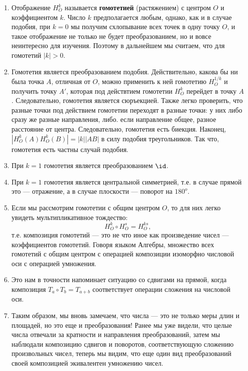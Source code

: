 \begin{enumerate}
\item Отображение $H_O^k$ называется \textbf{гомотетией} (растяжением) с центром $O$ и коэффициентом $k$. Число $k$ предполагается любым, однако, как и в случае подобия, при $k=0$ мы получим схлопывание всех точек в одну точку $O$, и такое отображение не только не будет преобразованием, но и вовсе неинтересно для изучения. Поэтому в дальнейшем мы считаем, что для гомотетий $|k|>0$.
\item Гомотетия является преобразованием подобия. Действительно, какова бы ни была точка $A$, отличная от $O$, можно применить к ней гомотетию $H_O^{1/k}$ и получить точку $A'$, которая под действтием гомотетии $H_O^k$ перейдет в точку $A$. Следовательно, гомотетия является сюръекцией. Также легко проверить, что разные точки под действием гомотетии переходят в разные точки: у них либо сразу же разные направления, либо. если направление общее, разное расстояние от центра. Следовательно, гомотетия есть биекция. Наконец, $|H_O^k(A)H_O^k(B)|=|k||AB|$ в силу подобия треугольников. Так что, гомотетия есть частны случай подобия.
\item При $k=1$ гомотетия является преобразованием $\id$.
\item При $k=1$ гомотетия является центральной симметрией, т.е. в случае прямой это --- отражение, а в случае плоскости --- поворот на $180^o$.
\item Если мы рассмотрим гомотетии с общим центром $O$, то для них легко увидеть мультипликативное тождество:
$$
H_O^k\circ H_O^s = H_O^{ks},
$$
т.е. композиция гомотетий --- это не что иное как произведение чисел --- коэффициентов гомотетий. Говоря языком Алгебры, множество всех гомотетий с общим центром с операцией композиции изоморфно числовой оси с операцией умножения.
\item Это нам в точности напоминает ситуацию со сдвигами на прямой, когда композиция $T_a\circ T_b=T_{a+b}$ соответствует операции сложения на числовой оси.
\item Таким образом, мы вновь замечаем, что числа --- это не только меры длин и площадей, но это еще и преобразования! Ранее мы уже видели, что целые числа отвечали за кратности и направления преобразований, затем мы наблюдали композицию сдвигов и поворотов, соответствующую сложению произвольных чисел, теперь мы видим, что еще один вид преобразований своей композицией экивалентен умножению чисел.

\end{enumerate}



